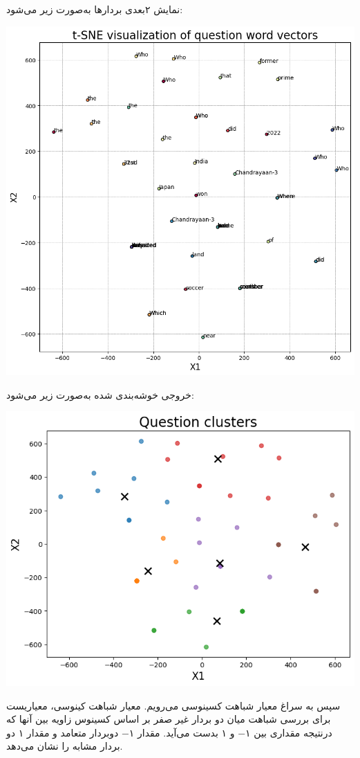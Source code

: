 \begin{enumerate}
\begin{qsolve}
		نمایش ۲بعدی بردار‌ها به‌صورت زیر می‌شود:
		
		\begin{center}
			\includegraphics*[width=0.8\linewidth]{pics/img24.png}
			\label{نمایش ۲بعدی بردار‌های سوال}
		\end{center}
	\end{qsolve}
	
	
	
	\begin{qsolve}
		خروجی خوشه‌بندی شده به‌صورت زیر می‌شود:
		\begin{center}
			\includegraphics*[width=0.6\linewidth]{pics/img25.png}
			\label{سوالات خوشه‌بندی شده}
		\end{center}
		
		
		سپس به سراغ معیار شباهت کسینوسی می‌رویم. معیار شباهت کینوسی، معیاریست برای بررسی شباهت میان دو بردار غیر صفر بر اساس کسینوس زاویه بین آنها که درنتیجه مقداری بین ۱− و ۱ بدست می‌آید. مقدار ۱− دوبردار متعامد و مقدار ۱ دو بردار مشابه را نشان می‌دهد.
		

\end{qsolve}
\end{enumerate}
